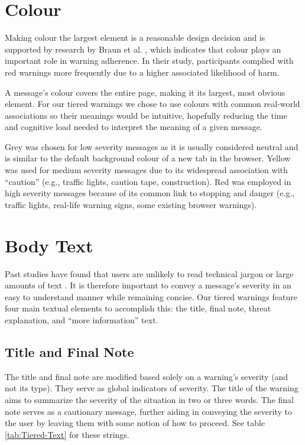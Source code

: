 \section{Colour}
Making colour the largest element is a reasonable design decision and is supported by research by Braun et al. \cite{braun1994color}, which indicates that colour plays an important role in warning adherence. In their study, participants complied with red warnings more frequently due to a higher associated likelihood of harm.

A message's colour covers the entire page, making it its largest, most obvious element. For our tiered warnings we chose to use colours with common real-world associations so their meanings would be intuitive, hopefully reducing the time and cognitive load needed to interpret the meaning of a given message.

Grey was chosen for low severity messages as it is usually considered neutral and is similar to the default background colour of a new tab in the browser. Yellow was used for medium severity messages due to its widespread association with ``caution'' (e.g., traffic lights, caution tape, construction). Red was employed in high severity messages because of its common link to stopping and danger (e.g., traffic lights, real-life warning signs, some existing browser warnings).

\section{Body Text}
Past studies have found that users are unlikely to read technical jargon or large amounts of text \cite{almuhimedi2014reputation, bravo2011bridging}. It is therefore important to convey a message's severity in an easy to understand manner while remaining concise. Our tiered warnings feature four main textual elements to accomplish this: the title, final note, threat explanation, and ``more information'' text.

\subsection{Title and Final Note}
The title and final note are modified based solely on a warning's severity (and not its type). They serve as global indicators of severity. The title of the warning aims to summarize the severity of the situation in two or three words. The final note serves as a cautionary message, further aiding in conveying the severity to the user by leaving them with some notion of how to proceed. See table \ref{tab:Tiered-Text} for these strings.

